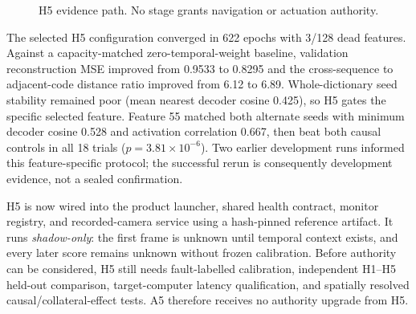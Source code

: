 \documentclass[sigconf,nonacm]{acmart}
\begin{document}
\begin{figure}[t]
\centering
{}
\caption{H5 evidence path. No stage grants navigation or actuation authority.}
\label{fig:h5}
\end{figure}

The selected H5 configuration converged in 622 epochs with 3/128 dead features.
Against a capacity-matched zero-temporal-weight baseline, validation
reconstruction MSE improved from 0.9533 to 0.8295 and the cross-sequence to
adjacent-code distance ratio improved from 6.12 to 6.89. Whole-dictionary seed
stability remained poor (mean nearest decoder cosine 0.425), so H5 gates the
specific selected feature. Feature 55 matched both alternate seeds with minimum
decoder cosine 0.528 and activation correlation 0.667, then beat both causal
controls in all 18 trials ($p=3.81\times10^{-6}$). Two earlier development runs
informed this feature-specific protocol; the successful rerun is consequently
development evidence, not a sealed confirmation.

H5 is now wired into the product launcher, shared health contract, monitor
registry, and recorded-camera service using a hash-pinned reference artifact.
It runs \emph{shadow-only}: the first frame is unknown until temporal context
exists, and every later score remains unknown without frozen calibration. Before
authority can be considered, H5 still needs fault-labelled calibration,
independent H1--H5 held-out comparison, target-computer latency qualification,
and spatially resolved causal/collateral-effect tests. A5 therefore receives no
authority upgrade from H5.
\end{document}

